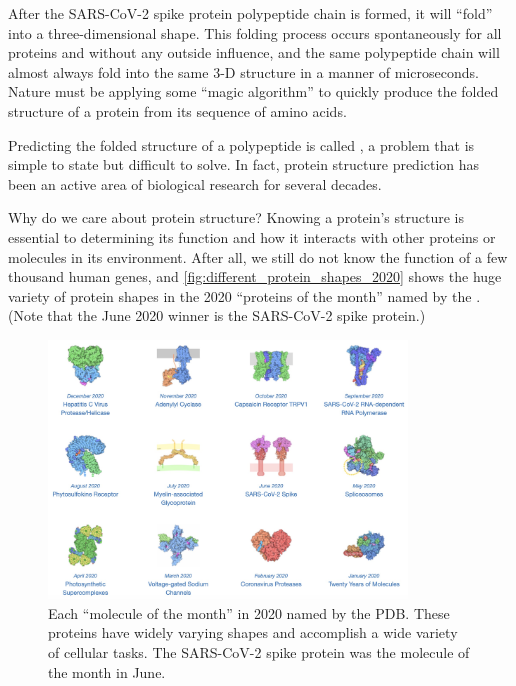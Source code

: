 After the SARS-CoV-2 spike protein polypeptide chain is formed, it will ``fold'' into a three-dimensional shape. This folding process occurs spontaneously for all proteins and without any outside influence, and the same polypeptide chain will almost always fold into the same 3-D structure in a manner of microseconds. Nature must be applying some ``magic algorithm'' to quickly produce the folded structure of a protein from its sequence of amino acids.

Predicting the folded structure of a polypeptide is called , a problem that is simple to state but difficult to solve. In fact, protein structure prediction has been an active area of biological research for several decades.

Why do we care about protein structure? Knowing a protein's structure is essential to determining its function and how it interacts with other proteins or molecules in its environment. After all, we still do not know the function of a few thousand human genes, and \autoref{fig:different_protein_shapes_2020} shows the huge variety of protein shapes in the 2020 ``proteins of the month'' named by the . (Note that the June 2020 winner is the SARS-CoV-2 spike protein.)

\begin{figure}[h]
	\centering
	\mySfFamily
	\includegraphics[width = 0.85\textwidth]{../images/different_protein_shapes_2020.jpg}
	\caption{Each ``molecule of the month'' in 2020 named by the PDB. These proteins have widely varying shapes and accomplish a wide variety of cellular tasks. The SARS-CoV-2 spike protein was the molecule of the month in June.}
	\label{fig:different_protein_shapes_2020}
\end{figure}

